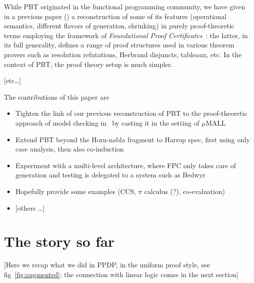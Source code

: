 \documentclass[a4paper]{easychair}
\begin{document}
While PBT originated in the functional programming community, we have
given in a previous paper (\cite{Blanco0M19}) a reconstruction of some
of its features (operational semantics, different flavors of
generation, shrinking) in purely proof-theoretic terms employing the
framework of \emph{Foundational Proof Certificates}~\cite{chihani17jar}: the
latter, in its full generality, defines a range of proof structures
used in various theorem provers such as resolution refutations,
Herbrand disjuncts, tableaux, etc.
%
In the context of PBT, the proof theory setup is much simpler.

\begin{center}
  [etc\dots]
\end{center}


The contributions of this paper are
\begin{itemize}
\item Tighten the link of our previous reconstruction of PBT to the
  proof-theoretic approach of model checking in~\cite{heath19jar} by casting it in the setting of $\mu$MALL
\item Extend PBT beyond the Horn-nabla fragment to Harrop spec, first using only case analysis, then also co-induction
\item Experiment with a multi-level architecture, where FPC only takes
  care of generation and testing  is delegated to a system such as Bedwyr
\item Hopefully provide some examples (CCS, $\pi$ calculus (?), co-evaluation)
\item
  \begin{center}
[others \dots]    
  \end{center}

\end{itemize}

\section{The story so far}
\label{sec:tecap}

\begin{center}
  [Here we recap what we did in PPDP, in the uniform proof style, see fig~\ref{fig:augmented}: the connection with linear logic comes in the next section]
\end{center}
\end{document}
